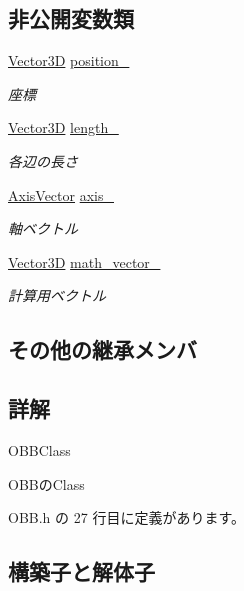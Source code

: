 \subsection*{非公開変数類}
\begin{DoxyCompactItemize}
\item 
\mbox{\hyperlink{class_vector3_d}{Vector3D}} \mbox{\hyperlink{class_o_b_b_ab05a884fc030d7a3cf7b355880d9194c}{position\+\_\+}}
\begin{DoxyCompactList}\small\item\em 座標 \end{DoxyCompactList}\item 
\mbox{\hyperlink{class_vector3_d}{Vector3D}} \mbox{\hyperlink{class_o_b_b_a04dc4d7036d26215f9c33a7cad633947}{length\+\_\+}}
\begin{DoxyCompactList}\small\item\em 各辺の長さ \end{DoxyCompactList}\item 
\mbox{\hyperlink{class_axis_vector}{Axis\+Vector}} \mbox{\hyperlink{class_o_b_b_ab002fad8cf0a9a08fc50407dc849aab1}{axis\+\_\+}}
\begin{DoxyCompactList}\small\item\em 軸ベクトル \end{DoxyCompactList}\item 
\mbox{\hyperlink{class_vector3_d}{Vector3D}} \mbox{\hyperlink{class_o_b_b_ae2bb48bafa38fdf30f0e383da193152c}{math\+\_\+vector\+\_\+}}
\begin{DoxyCompactList}\small\item\em 計算用ベクトル \end{DoxyCompactList}\end{DoxyCompactItemize}
\subsection*{その他の継承メンバ}


\subsection{詳解}
O\+B\+B\+Class 

O\+B\+Bの\+Class 

 O\+B\+B.\+h の 27 行目に定義があります。



\subsection{構築子と解体子}
\mbox{\label{class_o_b_b_af752af068c6fc1787f06556b6a71c929}} 
